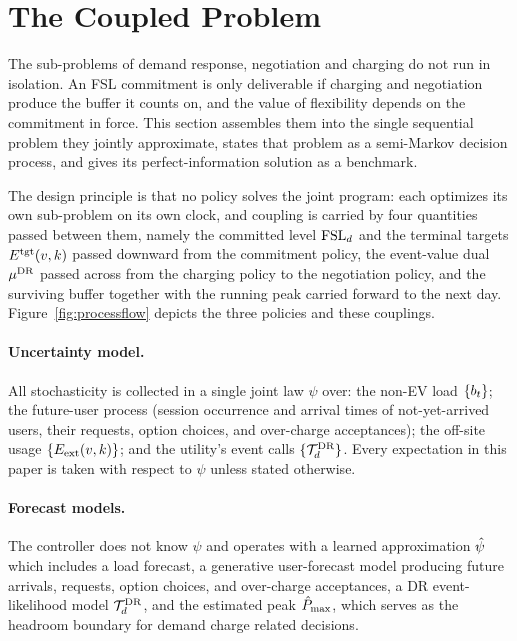 \section{The Coupled Problem}\label{sec:coupled}

The sub-problems of demand response, negotiation and charging do not run in isolation. An FSL commitment is only deliverable if charging and negotiation produce the buffer it counts on, and the value of flexibility depends on the commitment in force. This section assembles them into the single sequential problem they jointly approximate, states that problem as a semi-Markov decision process, and gives its perfect-information solution as a benchmark.

The design principle is that no policy solves the joint program: each optimizes its own sub-problem on its own clock, and coupling is carried by four quantities passed between them, namely the committed level $\mathrm{FSL}_d$ and the terminal targets $E^{\mathrm{tgt}}(v,k)$ passed downward from the commitment policy, the event-value dual $\mu^{\mathrm{DR}}$ passed across from the charging policy to the negotiation policy, and the surviving buffer together with the running peak carried forward to the next day. Figure~\ref{fig:processflow} depicts the three policies and these couplings.



\paragraph{Uncertainty model.} All stochasticity is collected in a
single joint law $\psi$ over: the non-EV load $\{b_{t}\}$; the future-user process (session occurrence and arrival times of not-yet-arrived users, their requests, option choices, and over-charge acceptances); the off-site usage $\{E_{\mathrm{ext}}(v,k)\}$; and the utility's event calls $\{\mathcal{T}^{\mathrm{DR}}_{d}\}$. Every expectation in this paper is taken with respect to $\psi$ unless stated otherwise.

\paragraph{Forecast models.} The controller does not know $\psi$ and operates with a learned approximation $\hat{\psi}$ which includes a load forecast, a generative user-forecast model producing future arrivals, requests, option choices, and over-charge acceptances, a DR event-likelihood model $\mathcal{T}^{\mathrm{DR}}_{d}$, and the estimated peak $\hat{P}_{\max}$, which serves as the headroom boundary for demand charge related decisions.




